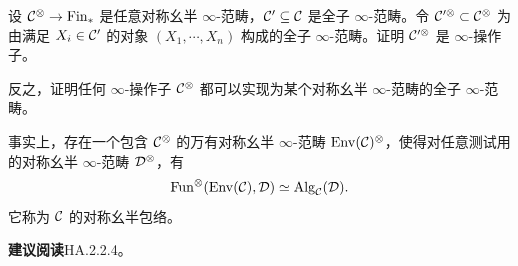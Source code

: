 \begin{exercise}\label{L21-A.2}
设 $\mathcal{C}^{\otimes}\to\mathrm{Fin}_{*}$ 是任意对称幺半 $\infty$-范畴，$\mathcal{C}'\subseteq\mathcal{C}$ 是全子 $\infty$-范畴。令 $\mathcal{C}^{\prime\otimes}\subset\mathcal{C}^{\otimes}$ 为由满足 $X_i\in\mathcal{C}'$ 的对象 $(X_1,\cdots,X_n)$ 构成的全子 $\infty$-范畴。证明 $\mathcal{C}^{\prime\otimes}$ 是 $\infty$-操作子。
\end{exercise}

\begin{exercise}\label{L21-A.3}
反之，证明任何 $\infty$-操作子 $\mathcal{C}^{\otimes}$ 都可以实现为某个对称幺半 $\infty$-范畴的全子 $\infty$-范畴。
\end{exercise}

\nitem\label{L21-A.4} 事实上，存在一个包含 $\mathcal{C}^{\otimes}$ 的万有对称幺半 $\infty$-范畴 $\operatorname{Env}(\mathcal{C})^{\otimes}$，使得对任意测试用的对称幺半 $\infty$-范畴 $\mathcal{D}^{\otimes}$，有
\[
\operatorname{Fun}^{\otimes}(\operatorname{Env}(\mathcal{C}),\mathcal{D})\simeq\operatorname{Alg}_{\mathcal{C}}(\mathcal{D}).
\]
它称为 $\mathcal{C}$ 的对称幺半包络。

\nitem\label{L21-A.5} \textbf{建议阅读}\quad HA.2.2.4。
